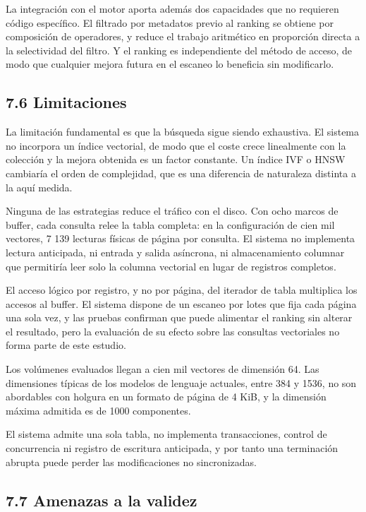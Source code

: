 \documentclass[11pt,a4paper]{article}
\let\pandocsubsection\subsection
\let\subsection\section
\let\subsubsection\pandocsubsection
\begin{document}
La integración con el motor aporta además dos capacidades que no
requieren código específico. El filtrado por metadatos previo al ranking
se obtiene por composición de operadores, y reduce el trabajo aritmético
en proporción directa a la selectividad del filtro. Y el ranking es
independiente del método de acceso, de modo que cualquier mejora futura
en el escaneo lo beneficia sin modificarlo.

\subsubsection{7.6 Limitaciones}\label{76-limitaciones}

La limitación fundamental es que la búsqueda sigue siendo exhaustiva. El
sistema no incorpora un índice vectorial, de modo que el coste crece
linealmente con la colección y la mejora obtenida es un factor
constante. Un índice IVF o HNSW cambiaría el orden de complejidad, que
es una diferencia de naturaleza distinta a la aquí medida.

Ninguna de las estrategias reduce el tráfico con el disco. Con ocho
marcos de buffer, cada consulta relee la tabla completa: en la
configuración de cien mil vectores, 7 139 lecturas físicas de página por
consulta. El sistema no implementa lectura anticipada, ni entrada y
salida asíncrona, ni almacenamiento columnar que permitiría leer solo la
columna vectorial en lugar de registros completos.

El acceso lógico por registro, y no por página, del iterador de tabla
multiplica los accesos al buffer. El sistema dispone de un escaneo por
lotes que fija cada página una sola vez, y las pruebas confirman que
puede alimentar el ranking sin alterar el resultado, pero la evaluación
de su efecto sobre las consultas vectoriales no forma parte de este
estudio.

Los volúmenes evaluados llegan a cien mil vectores de dimensión 64. Las
dimensiones típicas de los modelos de lenguaje actuales, entre 384 y
1536, no son abordables con holgura en un formato de página de 4 KiB, y
la dimensión máxima admitida es de 1000 componentes.

El sistema admite una sola tabla, no implementa transacciones, control
de concurrencia ni registro de escritura anticipada, y por tanto una
terminación abrupta puede perder las modificaciones no sincronizadas.

\subsubsection{7.7 Amenazas a la
validez}\label{77-amenazas-a-la-validez}
\end{document}
